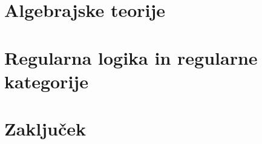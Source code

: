 \documentclass[12pt,a4paper]{book}
\begin{document}
\clearemptydoublepage
%
\mainmatter%
\setcounter{page}{1}
\pagestyle{fancy}
%
%
%
\chapter{Algebrajske teorije}

%
\chapter{Regularna logika in regularne kategorije}

%
\chapter{Zaključek}

%
{}

\end{document}
